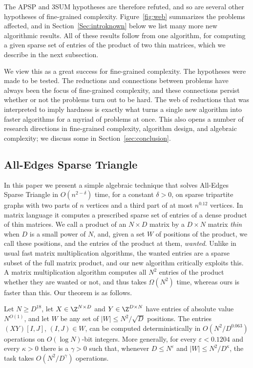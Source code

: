 The APSP and $3$SUM hypotheses are therefore refuted, and so are several other hypotheses of fine-grained complexity. Figure~\ref{fig:web} summarizes the problems affected, and in Section~\ref{Sec:introknown} below we list many more new algorithmic results. All of these results follow from one algorithm, for computing a given sparse set of entries of the product of two thin matrices, which we describe in the next subsection.

We view this as a great success for fine-grained complexity. The hypotheses were made to be tested.
The reductions and connections between problems have always been the focus of fine-grained complexity, and these connections persist whether or not the problems turn out to be hard.
The web of reductions that was interpreted to imply hardness is exactly what turns a single new algorithm into faster algorithms for a myriad of problems at once.
This also opens a number of research directions in fine-grained complexity, algorithm design, and algebraic complexity; we discuss some in Section~\ref{sec:conclusion}.

\subsection{All-Edges Sparse Triangle}
In this paper we present a simple algebraic technique that solves All-Edges Sparse Triangle in $O(n^{2-\delta})$ time, for a constant $\delta>0$, on sparse tripartite graphs with two parts of $n$ vertices and a third part of at most $n^{0.12}$ vertices. In matrix language it computes a prescribed sparse set of entries of a dense product of thin matrices. We call a product of an $N\times D$ matrix by a $D\times N$ matrix \emph{thin} when $D$ is a small power of $N$, and, given a set $W$ of positions of the product, we call these positions, and the entries of the product at them, \emph{wanted}. Unlike in usual fast matrix multiplication algorithms, the wanted entries are a sparse subset of the full matrix product, and our new algorithm critically exploits this. A matrix multiplication algorithm computes all $N^2$ entries of the product whether they are wanted or not, and thus takes $\Omega(N^2)$ time, whereas ours is faster than this. Our theorem is as follows.

\begin{theorem}\label{thm:intro}
Let $N\ge D^{18}$, let $X\in\Z^{N\times D}$ and $Y\in\Z^{D\times N}$ have entries of absolute value $N^{O(1)}$, and let $W$ be any set of $|W|\le N^2/\sqrt D$ positions. The entries $(XY)[I,J]$, $(I,J)\in W$, can be computed deterministically in $O(N^2/D^{0.063})$ operations on $O(\log N)$-bit integers. More generally, for every $\varepsilon<0.1204$ and every $\kappa>0$ there is a $\gamma>0$ such that, whenever $D\le N^{\varepsilon}$ and $|W|\le N^2/D^{\kappa}$, the task takes $O(N^2/D^{\gamma})$ operations.
\end{theorem}

